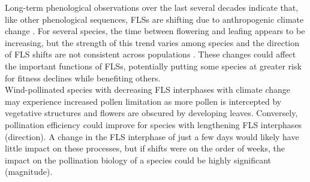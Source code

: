 \documentclass[11pt]{article}
\begin{document}
\noindent Long-term phenological observations over the last several decades indicate that, like other phenological sequences, FLSs are shifting due to anthropogenic climate change \citep{Buonaiuto2020}. For several species, the time between flowering and leafing appears to be increasing, but the strength of this trend varies among species and the direction of FLS shifts are not consistent across populations \citep{Buonaiuto2020}. These changes could affect the important functions of FLSs, potentially putting some species at greater risk for fitness declines while benefiting others.\\ %

\noindent Wind-pollinated species with decreasing FLS interphases with climate change may experience increased pollen limitation as more pollen is intercepted by vegetative structures and flowers are obscured by developing leaves. Conversely, pollination efficiency could improve for species with lengthening FLS interphases (direction). A change in the FLS interphase of just a few days would likely have little impact on these processes, but if shifts were on the order of weeks, the impact on the pollination biology of a species could be highly significant (magnitude).\\ %
\end{document}
